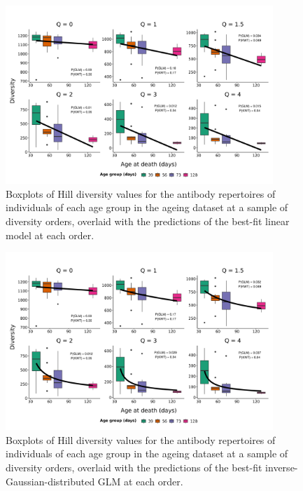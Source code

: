 \begin{figure}
\centering
\includegraphics[width = 0.9\textwidth]{_Figures/png/ageing-clone-diversity-solo-fit-linear}
\caption{Boxplots of Hill diversity values for the antibody repertoires of individuals of each age group in the \igseq ageing dataset at a sample of diversity orders, overlaid with the predictions of the best-fit linear model at each order.}
\label{fig:igseq-ageing-clone-diversity-solo-fit-linear}
\end{figure}

\begin{figure}
\centering
\includegraphics[width = 0.9\textwidth]{_Figures/png/ageing-clone-diversity-solo-fit-igauss}
\caption{Boxplots of Hill diversity values for the antibody repertoires of individuals of each age group in the \igseq ageing dataset at a sample of diversity orders, overlaid with the predictions of the best-fit inverse-Gaussian-distributed GLM at each order.}
\label{fig:igseq-ageing-clone-diversity-solo-fit-igauss}
\end{figure}

